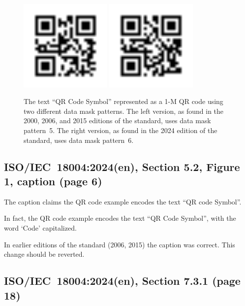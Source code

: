 \documentclass[a4paper,twoside]{article}
\newcommand{\shortstandard}{ISO/IEC~18004}
\newcommand{\standard}{\shortstandard:2024(en)}
\begin{document}
\begin{figure}[h!]
\centering
\includegraphics[width=0.4\textwidth]{images/qrcode_iso18004_2000_2006_2015_QRCodeSymbol_1Mp5.png}
\includegraphics[width=0.4\textwidth]{images/qrcode_iso18004_2024_QRCodeSymbol_1Mp6.png}
\caption{The text ``QR Code Symbol'' represented as a 1-M QR code using two different data mask patterns.
         The left version, as found in the 2000, 2006, and 2015 editions of the standard, uses data mask pattern~5.
         The right version, as found in the 2024 edition of the standard, uses data mask pattern~6.}
\label{fig:dmp-changed-1}
\end{figure}

\subsection{\standard, Section 5.2, Figure 1, caption (page 6)}

The caption claims the QR code example encodes the text ``QR code Symbol''.

In fact, the QR code example encodes the text ``QR Code Symbol'', with the word `Code' capitalized.

In earlier editions of the standard (2006, 2015) the caption was correct. This change should be reverted.

\subsection{\standard, Section 7.3.1 (page 18)}
\end{document}

